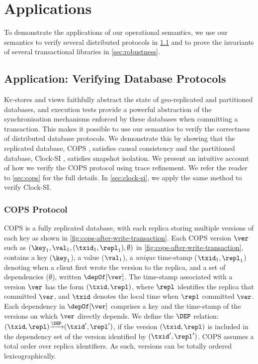 \section{Applications}
\label{sec:applications}
\label{sec:program-analysis}

To demonstrate the applications of our operational semantics, 
we use our semantics to verify several distributed protocols in \cref{sec:verify-impl} and
to prove the invariants of several transactional libraries in \cref{sec:robustness}.

\subsection{Application: Verifying Database Protocols}
\label{sec:verify-impl}
Kv-stores and views faithfully abstract the state of geo-replicated and partitioned
databases, and execution tests provide a powerful abstraction of the synchronisation mechanisms 
enforced by these databases when committing a transaction. 
This makes it possible to use our 
semantics to verify the correctness of distributed database protocols. 
We demonstrate this by showing that the replicated database,
COPS \cite{cops}, satisfies causal consistency and
the partitioned database, Clock-SI \cite{clocksi}, satisfies snapshot isolation.
We present an intuitive account of how we verify the COPS protocol using trace refinement.
We refer the reader to \cref{sec:cops} for the full details.
In \cref{sec:clock-si}, we apply the same method to verify Clock-SI.



\subsubsection{COPS Protocol} 
COPS is a fully replicated database, with each replica storing multiple versions of each key as shown in \cref{fig:cops-after-write-transaction}. 
Each COPS version \( \ver \)
such as \( (\key_1,\val_1,(\txid_1,\repl_1), \emptyset) \) in \cref{fig:cops-after-write-transaction},
contains a key ($\key_1$), a value ($\val_1$), a \emph{unique} time-stamp ($\txid_1, \repl_1$) denoting
when a client first wrote the version to the replica, 
and a set of dependencies ($\emptyset$), written $\depOf[\ver]$. 
The time-stamp associated with a version $\ver$ has the form $(\txid, \repl)$, where $\repl$ identifies the replica that committed $\ver$, 
and $\txid$ denotes the local time when $\repl$ committed $\ver$. 
Each dependency in $\depOf[\ver]$ comprises a key and the time-stamp of the versions on which $\ver$ directly depends.  
We define the \( \DEP \) relation: \( (\txid,\repl) {\xrightarrow{\DEP}} (\txid',\repl') \),
if the version \( (\txid,\repl) \) is included in the dependency set of the version identified by \( (\txid',\repl')\).
COPS assumes a total order over replica identifiers. 
As such, versions can be totally ordered lexicographically. 

